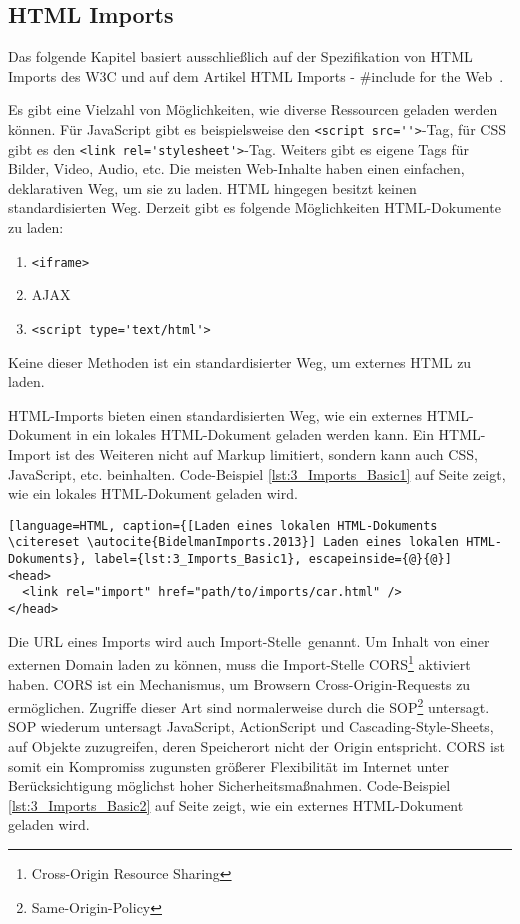 \subsection{HTML Imports}
\label{sec:3_WC_Imports}

Das folgende Kapitel basiert ausschließlich auf der Spezifikation von HTML Imports des W3C \citereset \autocite[siehe][]{GlazkovMorrita.2013} und auf dem Artikel \glqq HTML Imports - \#include for the Web\grqq\ \citereset \autocite[siehe][]{BidelmanImports.2013}.

Es gibt eine Vielzahl von Möglichkeiten, wie diverse Ressourcen geladen werden können. Für JavaScript gibt es beispielsweise den \lstinline|<script src=''>|-Tag, für CSS gibt es den \lstinline|<link rel='stylesheet'>|-Tag. Weiters gibt es eigene Tags für Bilder, Video, Audio, etc. Die meisten Web-Inhalte haben einen einfachen, deklarativen Weg, um sie zu laden. HTML hingegen besitzt keinen standardisierten Weg. Derzeit gibt es folgende Möglichkeiten HTML-Dokumente zu laden:
\begin{enumerate}
\item \lstinline|<iframe>|
\item AJAX
\item \lstinline|<script type='text/html'>|
\end{enumerate}

Keine dieser Methoden ist ein standardisierter Weg, um externes HTML zu laden.

HTML-Imports bieten einen standardisierten Weg, wie ein externes HTML-Dokument in ein lokales HTML-Dokument geladen werden kann. Ein HTML-Import ist des Weiteren nicht auf Markup limitiert, sondern kann auch CSS, JavaScript, etc. beinhalten. Code-Beispiel \ref{lst:3_Imports_Basic1} auf Seite \pageref{lst:3_Imports_Basic1} zeigt, wie ein lokales HTML-Dokument geladen wird.

\begin{lstlisting}[language=HTML, caption={[Laden eines lokalen HTML-Dokuments \citereset \autocite{BidelmanImports.2013}] Laden eines lokalen HTML-Dokuments}, label={lst:3_Imports_Basic1}, escapeinside={@}{@}]
<head>
  <link rel="import" href="path/to/imports/car.html" />
</head>
\end{lstlisting}

Die URL eines Imports wird auch \glqq Import-Stelle\grqq\ genannt. Um Inhalt von einer externen Domain laden zu können, muss die Import-Stelle CORS\footnote{Cross-Origin Resource Sharing} aktiviert haben. CORS ist ein Mechanismus, um Browsern Cross-Origin-Requests zu ermöglichen. Zugriffe dieser Art sind normalerweise durch die SOP\footnote{Same-Origin-Policy} untersagt. SOP wiederum untersagt JavaScript, ActionScript und Cascading-Style-Sheets, auf Objekte zuzugreifen, deren Speicherort nicht der Origin entspricht. CORS ist somit ein Kompromiss zugunsten größerer Flexibilität im Internet unter Berücksichtigung möglichst hoher Sicherheitsmaßnahmen. Code-Beispiel \ref{lst:3_Imports_Basic2} auf Seite \pageref{lst:3_Imports_Basic2} zeigt, wie ein externes HTML-Dokument geladen wird.

